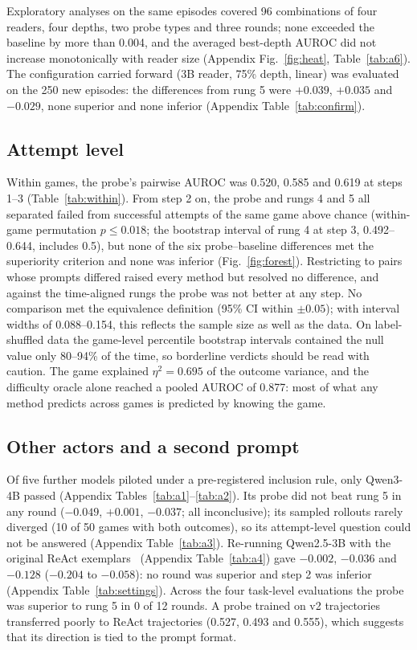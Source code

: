 \documentclass[10pt]{article}
\begin{document}


Exploratory analyses on the same episodes covered 96 combinations of four readers, four depths, two probe types and three rounds; none exceeded the baseline by more than 0.004, and the averaged best-depth AUROC did not increase monotonically with reader size (Appendix Fig.~\ref{fig:heat}, Table~\ref{tab:a6}).
The configuration carried forward (3B reader, 75\% depth, linear) was evaluated on the 250 new episodes: the differences from rung 5 were $+0.039$, $+0.035$ and $-0.029$, none superior and none inferior (Appendix Table~\ref{tab:confirm}).

\subsection{Attempt level}\label{sec:attempt}
Within games, the probe's pairwise AUROC was 0.520, 0.585 and 0.619 at steps 1--3 (Table~\ref{tab:within}). From step 2 on, the probe and rungs 4 and 5 all separated failed from successful attempts of the same game above chance (within-game permutation $p \le 0.018$; the bootstrap interval of rung 4 at step 3, 0.492--0.644, includes 0.5),
but none of the six probe--baseline differences met the superiority criterion and none was inferior (Fig.~\ref{fig:forest}). Restricting to pairs whose prompts differed raised every method but resolved no difference, and against the time-aligned rungs the probe was not better at any step.
No comparison met the equivalence definition (95\% CI within $\pm 0.05$); with interval widths of 0.088--0.154, this reflects the sample size as well as the data. On label-shuffled data the game-level percentile bootstrap intervals contained the null value only 80--94\% of the time, so borderline verdicts should be read with caution.
The game explained $\eta^2 = 0.695$ of the outcome variance, and the difficulty oracle alone reached a pooled AUROC of 0.877: most of what any method predicts across games is predicted by knowing the game.




\subsection{Other actors and a second prompt}\label{sec:actors}
Of five further models piloted under a pre-registered inclusion rule, only Qwen3-4B passed (Appendix Tables~\ref{tab:a1}--\ref{tab:a2}). Its probe did not beat rung 5 in any round ($-0.049$, $+0.001$, $-0.037$; all inconclusive); its sampled rollouts rarely diverged (10 of 50 games with both outcomes), so its attempt-level question could not be answered (Appendix Table~\ref{tab:a3}).
Re-running Qwen2.5-3B with the original ReAct exemplars~\cite{yao2023react} (Appendix Table~\ref{tab:a4}) gave $-0.002$, $-0.036$ and $-0.128$ ($-0.204$ to $-0.058$): no round was superior and step 2 was inferior (Appendix Table~\ref{tab:settings}).
Across the four task-level evaluations the probe was superior to rung 5 in 0 of 12 rounds. A probe trained on v2 trajectories transferred poorly to ReAct trajectories (0.527, 0.493 and 0.555), which suggests that its direction is tied to the prompt format.
\end{document}
